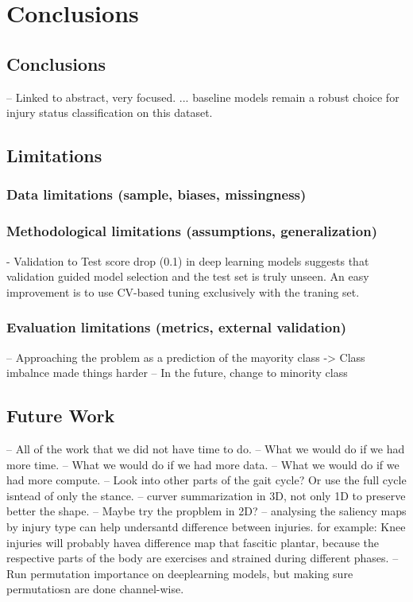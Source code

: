 \chapter{Conclusions}\label{chap:conclusions}

\section{Conclusions}\label{sec:conc-conclusions}
-- Linked to abstract, very focused.
... baseline models remain a robust choice for injury status classification on this dataset.

\section{Limitations}\label{sec:conc-limitations}

\subsection{Data limitations (sample, biases, missingness)}\label{sec:limitations-data}

\subsection{Methodological limitations (assumptions, generalization)}\label{sec:limitations-methods}
- Validation to Test score drop (0.1) in deep learning models suggests that validation guided model selection and the test set is truly unseen. An easy improvement is to use CV-based tuning exclusively with the traning set.

\subsection{Evaluation limitations (metrics, external validation)}\label{sec:limitations-evaluation}
-- Approaching the problem as a prediction of the mayority class -> Class imbalnce made things harder
    -- In the future, change to minority class

\section{Future Work}\label{sec:conc-future-work}
-- All of the work that we did not have time to do.
-- What we would do if we had more time.
-- What we would do if we had more data.
-- What we would do if we had more compute.
-- Look into other parts of the gait cycle? Or use the full cycle isntead of only the stance.
-- curver summarization in 3D, not only 1D to preserve better the shape.
-- Maybe try the propblem in 2D?
-- analysing the saliency maps by injury type can help undersantd difference between injuries. for example: Knee injuries will probably havea difference map that fascitic plantar, because the respective parts of the body are exercises and strained during different phases.
-- Run permutation importance on deeplearning models, but making sure permutatiosn are done channel-wise.
